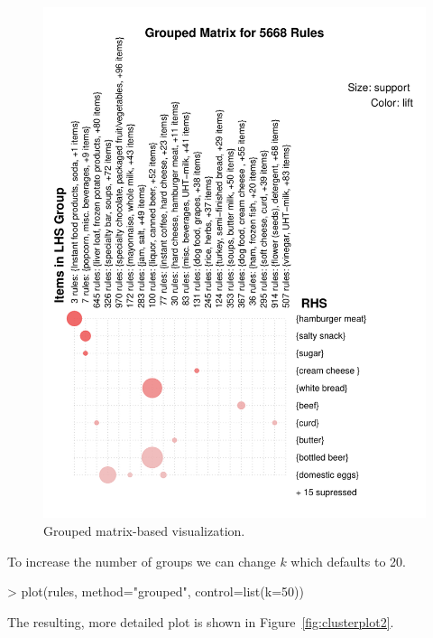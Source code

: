 \documentclass[nojss]{jss}
\begin{document}
\begin{figure}
\centering
\includegraphics[width=12cm]{arulesViz-clusterplot1}
\caption{Grouped matrix-based visualization.\label{fig:clusterplot1}}
\end{figure}

To increase the number of groups we can change $k$ which defaults to 20.

\begin{Schunk}
\begin{Sinput}
> plot(rules, method="grouped", control=list(k=50))
\end{Sinput}
\end{Schunk}

The resulting, more detailed plot is shown in Figure~\ref{fig:clusterplot2}.
\end{document}
